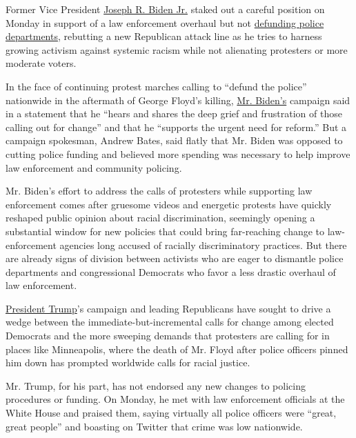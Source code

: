 Former Vice President
\href{https://www.nytimes3xbfgragh.onion/interactive/2020/us/elections/joe-biden.html}{Joseph
R. Biden Jr.} staked out a careful position on Monday in support of a
law enforcement overhaul but not
\href{https://www.nytimes3xbfgragh.onion/2020/08/19/us/politics/democrats-biden-defund-police.html}{defunding
police departments}, rebutting a new Republican attack line as he tries
to harness growing activism against systemic racism while not alienating
protesters or more moderate voters.

In the face of continuing protest marches calling to ``defund the
police'' nationwide in the aftermath of George Floyd's killing,
\href{https://www.nytimes3xbfgragh.onion/2020/06/10/us/politics/joe-biden-black-vice-president.html}{Mr.
Biden's} campaign said in a statement that he ``hears and shares the
deep grief and frustration of those calling out for change'' and that he
``supports the urgent need for reform.'' But a campaign spokesman,
Andrew Bates, said flatly that Mr. Biden was opposed to cutting police
funding and believed more spending was necessary to help improve law
enforcement and community policing.

Mr. Biden's effort to address the calls of protesters while supporting
law enforcement comes after gruesome videos and energetic protests have
quickly reshaped public opinion about racial discrimination, seemingly
opening a substantial window for new policies that could bring
far-reaching change to law-enforcement agencies long accused of racially
discriminatory practices. But there are already signs of division
between activists who are eager to dismantle police departments and
congressional Democrats who favor a less drastic overhaul of law
enforcement.

\href{https://www.nytimes3xbfgragh.onion/interactive/2020/us/elections/donald-trump.html}{President
Trump}'s campaign and leading Republicans have sought to drive a wedge
between the immediate-but-incremental calls for change among elected
Democrats and the more sweeping demands that protesters are calling for
in places like Minneapolis, where the death of Mr. Floyd after police
officers pinned him down has prompted worldwide calls for racial
justice.

Mr. Trump, for his part, has not endorsed any new changes to policing
procedures or funding. On Monday, he met with law enforcement officials
at the White House and praised them, saying virtually all police
officers were ``great, great people'' and boasting on Twitter that crime
was low nationwide.

